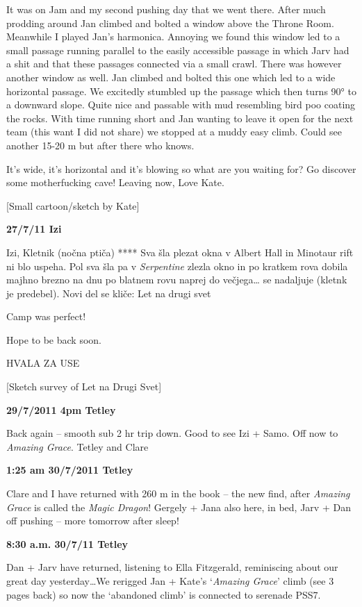 It was on Jam and my second pushing day that we went there. After much
prodding around Jan climbed and bolted a window above the Throne Room.
Meanwhile I played Jan's harmonica. Annoying we found this window led to
a small passage running parallel to the easily accessible passage in
which Jarv had a shit and that these passages connected via a small
crawl. There was however another window as well. Jan climbed and bolted
this one which led to a wide horizontal passage. We excitedly stumbled
up the passage which then turns 90° to a downward slope. Quite nice and
passable with mud resembling bird poo coating the rocks. With time
running short and Jan wanting to leave it open for the next team (this
want I did not share) we stopped at a muddy easy climb. Could see
another 15-20 m but after there who knows.

It's wide, it's horizontal and it's blowing so what are you waiting for?
Go discover some motherfucking cave! Leaving now, Love Kate.

{[}Small cartoon/sketch by Kate{]}

\textbf{27/7/11 Izi}

Izi, Kletnik (nočna ptiča) **** Sva šla plezat okna v Albert Hall in
Minotaur rift ni blo uspeha. Pol sva šla pa v \emph{Serpentine} zlezla
okno in po kratkem rova dobila majhno brezno na dnu po blatnem rovu
naprej do večjega\ldots{} se nadaljuje (kletnk je predebel). Novi del se
kliče: Let na drugi svet

Camp was perfect!

Hope to be back soon.

HVALA ZA USE

{[}Sketch survey of Let na Drugi Svet{]}

\textbf{29/7/2011 4pm Tetley}

Back again -- smooth sub 2 hr trip down. Good to see Izi + Samo. Off now
to \emph{Amazing Grace}. Tetley and Clare

\textbf{1:25 am 30/7/2011 Tetley}

Clare and I have returned with 260 m in the book -- the new find, after
\emph{Amazing Grace} is called the \emph{Magic Dragon}! Gergely + Jana
also here, in bed, Jarv + Dan off pushing -- more tomorrow after sleep!

\textbf{8:30 a.m. 30/7/11 Tetley}

Dan + Jarv have returned, listening to Ella Fitzgerald, reminiscing
about our great day yesterday\ldots{}We rerigged Jan + Kate's
`\emph{Amazing Grace}' climb (see 3 pages back) so now the `abandoned
climb' is connected to serenade PSS7.

